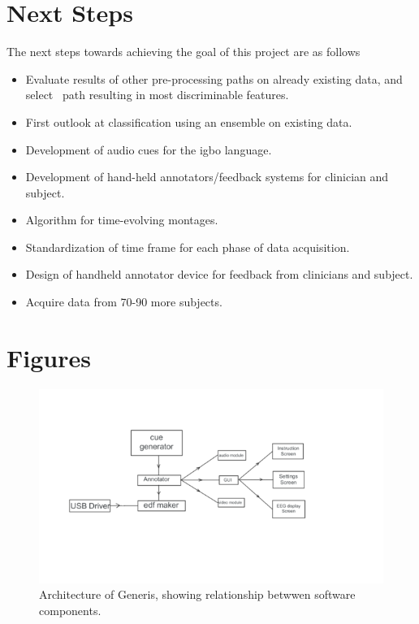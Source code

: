 \documentclass[10pt]{article}
\begin{document}
\section{Next Steps}\label{sec:nextSteps}
The next steps towards achieving the goal of this project are as follows
\begin{itemize}
  \item Evaluate results of other pre-processing paths on already existing data, and select \
  path resulting in most discriminable features.
  \item First outlook at classification using an ensemble on existing data.
  \item Development of audio cues for the igbo language.
  \item Development of hand-held annotators/feedback systems for clinician and subject.
  \item Algorithm for time-evolving montages.
  \item Standardization of time frame for each phase of data acquisition.
  \item Design of handheld annotator device for feedback from clinicians and subject.
  \item Acquire data from 70-90 more subjects.
\end{itemize}



\section{Figures}\label{sec:figures}
\begin{figure}[H]
  \includegraphics{images/Generis_Architecture.png}
  \caption{Architecture of Generis, showing relationship betwwen software components.}
  \label{fig:Generis Architecure}
\end{figure}
\end{document}
